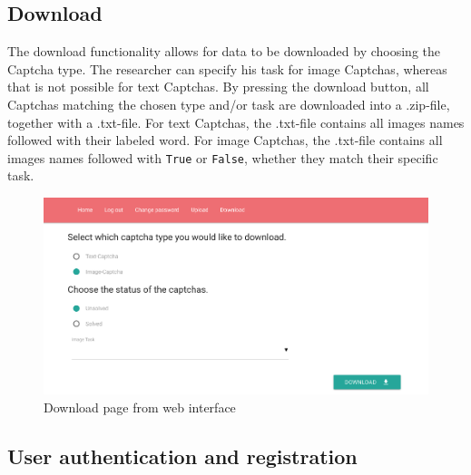 \subsection{Download}

The download functionality allows for data to be downloaded by choosing the Captcha type. The researcher can specify his task for image Captchas, whereas that is not possible for text Captchas. By pressing the download button, all Captchas matching the chosen type and/or task are downloaded into a .zip-file, together with a .txt-file. For text Captchas, the .txt-file contains all images names followed with their labeled word. For image Captchas, the .txt-file contains all images names followed with \verb|True| or \verb|False|, whether they match their specific task.
\begin{figure}[H]
\centering
\includegraphics[width=1\linewidth]{content/figures/download.png}
\caption{Download page from web interface}
\label{fig:download}
\end{figure}

\subsection{User authentication and registration}

